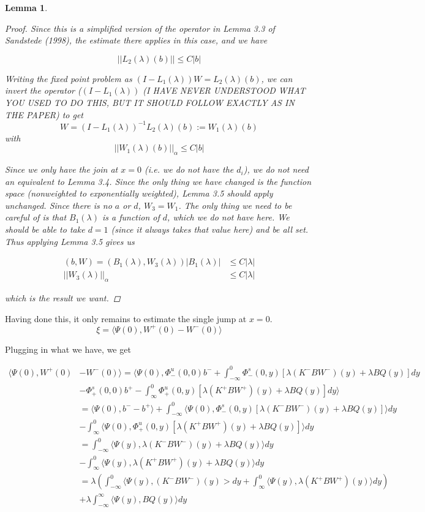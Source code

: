 \documentclass[12pt]{article}
\newtheorem{lemma}{Lemma}
\begin{document}
\begin{lemma}
\begin{proof}
Since this is a simplified version of the operator in Lemma 3.3 of Sandstede (1998), the estimate there applies in this case, and we have

\[
||L_2(\lambda)(b)|| \leq C|b|
\]

Writing the fixed point problem as $(I - L_1(\lambda))W = L_2(\lambda)(b)$, we can invert the operator ($(I - L_1(\lambda))$ (I HAVE NEVER UNDERSTOOD WHAT YOU USED TO DO THIS, BUT IT SHOULD FOLLOW EXACTLY AS IN THE PAPER) to get
\[
W = (I - L_1(\lambda))^{-1} L_2(\lambda)(b) := W_1(\lambda)(b)
\]
with 
\[
||W_1(\lambda)(b)||_\alpha \leq C|b|
\]

Since we only have the join at $x = 0$ (i.e. we do not have the $d_i$), we do not need an equivalent to Lemma 3.4. Since the only thing we have changed is the function space (nonweighted to exponentially weighted), Lemma 3.5 should apply unchanged. Since there is no $a$ or $d$, $W_3 = W_1$. The only thing we need to be careful of is that $B_1(\lambda)$ is a function of $d$, which we do not have here. We should be able to take $d = 1$ (since it always takes that value here) and be all set. Thus applying Lemma 3.5 gives us

\begin{align*}
(b, W) = (B_1(\lambda), W_3(\lambda))
|B_1(\lambda)| &\leq C|\lambda| \\
||W_3(\lambda)||_\alpha &\leq C|\lambda|
\end{align*}

which is the result we want.
\end{proof}
\end{lemma}

Having done this, it only remains to estimate the single jump at $x = 0$.
\[
\xi = \langle \Psi(0), W^+(0) - W^-(0) \rangle
\]

Plugging in what we have, we get

\begin{align*}
\langle\Psi(0), W^+(0) &- W^-(0)\rangle = \langle \Psi(0), \Phi^u_-(0, 0)b^- + \int_{-\infty}^0 \Phi^s_-(0, y)[\lambda (K^- B W^-)(y) + \lambda B Q(y) ] dy  \\
&- \Phi^s_+(0, 0)b^+ - \int_\infty^0 \Phi^u_+(0, y)[\lambda (K^+ B W^+)(y) + \lambda B Q(y) ] dy \rangle\\
&= \langle \Psi(0), b^- - b^+\rangle + \int_{-\infty}^0 \langle \Psi(0), \Phi^s_-(0, y)[\lambda (K^- B W^-)(y) + \lambda B Q(y) ] \rangle dy  \\
&- \int_\infty^0 \langle \Psi(0), \Phi^u_+(0, y)[\lambda (K^+ B W^+)(y) + \lambda B Q(y) ] \rangle dy  \\
&= \int_{-\infty}^0 \langle \Psi(y), \lambda (K^- B W^-)(y) + \lambda B Q(y) \rangle dy \\
&- \int_\infty^0 \langle \Psi(y), \lambda (K^+ B W^+)(y) + \lambda B Q(y)  \rangle dy \\
&= \lambda\left( \int_{-\infty}^0 \langle \Psi(y), (K^- B W^-)(y) > dy + \int_\infty^0 \langle \Psi(y), \lambda (K^+ B W^+)(y) \rangle dy \right) \\
&+ \lambda \int_{-\infty}^\infty \langle\Psi(y), BQ(y) \rangle dy
\end{align*}
\end{document}
